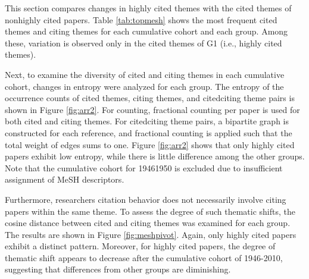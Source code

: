 This section compares changes in highly cited themes with the cited themes of nonhighly cited papers.
Table \ref{tab:topmesh} shows the most frequent cited themes and citing themes for each cumulative cohort and each group. Among these, variation is observed only in the cited themes of G1 (i.e., highly cited themes).

Next, to examine the diversity of cited and citing themes in each cumulative cohort, changes in entropy were analyzed for each group. The entropy of the occurrence counts of cited themes, citing themes, and citedciting theme pairs is shown in Figure \ref{fig:arr2}. For counting, fractional counting per paper is used for both cited and citing themes. For citedciting theme pairs, a bipartite graph is constructed for each reference, and fractional counting is applied such that the total weight of edges sums to one. Figure \ref{fig:arr2} shows that only highly cited papers exhibit low entropy, while there is little difference among the other groups. Note that the cumulative cohort for 19461950 is excluded due to insufficient assignment of MeSH descriptors.

Furthermore, researchers citation behavior does not necessarily involve citing papers within the same theme. To assess the degree of such thematic shifts, the cosine distance between cited and citing themes was examined for each group. The results are shown in Figure \ref{fig:meshpivot}. Again, only highly cited papers exhibit a distinct pattern. Moreover, for highly cited papers, the degree of thematic shift appears to decrease after the cumulative cohort of 1946-2010, suggesting that differences from other groups are diminishing.

